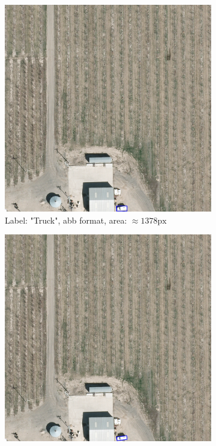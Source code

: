 \begin{figure}[h]
    \centering
    
    \begin{subfigure}[b]{0.45\textwidth}
        \centering
        \includegraphics[trim={550pt 0pt 410pt 990pt},clip,width=\textwidth]{images/015Results/01abb_vs_obb/abb_truck.png}
        \caption{Label: "Truck", abb format, area: $\approx 1378 \text{px}$}
        \label{fig:abb_truck}
    \end{subfigure}
    \hfill
    \begin{subfigure}[b]{0.45\textwidth}
        \centering
        \includegraphics[trim={550pt 0pt 410pt 990pt},clip,width=\textwidth]{images/015Results/01abb_vs_obb/obb_truck.png}

\end{subfigure}
\end{figure}
